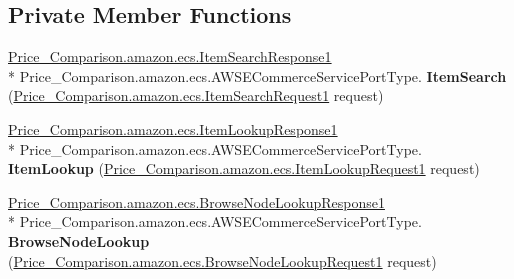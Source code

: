 \subsection*{Private Member Functions}
\begin{DoxyCompactItemize}
\item 
\hypertarget{class_price___comparison_1_1amazon_1_1ecs_1_1_a_w_s_e_commerce_service_port_type_client_a558eb6a2ae4d051321c538e5bd19fc6f}{\hyperlink{class_price___comparison_1_1amazon_1_1ecs_1_1_item_search_response1}{Price\-\_\-\-Comparison.\-amazon.\-ecs.\-Item\-Search\-Response1} \\*
Price\-\_\-\-Comparison.\-amazon.\-ecs.\-A\-W\-S\-E\-Commerce\-Service\-Port\-Type. {\bfseries Item\-Search} (\hyperlink{class_price___comparison_1_1amazon_1_1ecs_1_1_item_search_request1}{Price\-\_\-\-Comparison.\-amazon.\-ecs.\-Item\-Search\-Request1} request)}\label{class_price___comparison_1_1amazon_1_1ecs_1_1_a_w_s_e_commerce_service_port_type_client_a558eb6a2ae4d051321c538e5bd19fc6f}

\item 
\hypertarget{class_price___comparison_1_1amazon_1_1ecs_1_1_a_w_s_e_commerce_service_port_type_client_a6f7f4ae12e0cf3ff21f786d8a78ca7a8}{\hyperlink{class_price___comparison_1_1amazon_1_1ecs_1_1_item_lookup_response1}{Price\-\_\-\-Comparison.\-amazon.\-ecs.\-Item\-Lookup\-Response1} \\*
Price\-\_\-\-Comparison.\-amazon.\-ecs.\-A\-W\-S\-E\-Commerce\-Service\-Port\-Type. {\bfseries Item\-Lookup} (\hyperlink{class_price___comparison_1_1amazon_1_1ecs_1_1_item_lookup_request1}{Price\-\_\-\-Comparison.\-amazon.\-ecs.\-Item\-Lookup\-Request1} request)}\label{class_price___comparison_1_1amazon_1_1ecs_1_1_a_w_s_e_commerce_service_port_type_client_a6f7f4ae12e0cf3ff21f786d8a78ca7a8}

\item 
\hypertarget{class_price___comparison_1_1amazon_1_1ecs_1_1_a_w_s_e_commerce_service_port_type_client_a4bb988ce9974007307cd594208b2a891}{\hyperlink{class_price___comparison_1_1amazon_1_1ecs_1_1_browse_node_lookup_response1}{Price\-\_\-\-Comparison.\-amazon.\-ecs.\-Browse\-Node\-Lookup\-Response1} \\*
Price\-\_\-\-Comparison.\-amazon.\-ecs.\-A\-W\-S\-E\-Commerce\-Service\-Port\-Type. {\bfseries Browse\-Node\-Lookup} (\hyperlink{class_price___comparison_1_1amazon_1_1ecs_1_1_browse_node_lookup_request1}{Price\-\_\-\-Comparison.\-amazon.\-ecs.\-Browse\-Node\-Lookup\-Request1} request)}\label{class_price___comparison_1_1amazon_1_1ecs_1_1_a_w_s_e_commerce_service_port_type_client_a4bb988ce9974007307cd594208b2a891}


\end{DoxyCompactItemize}
